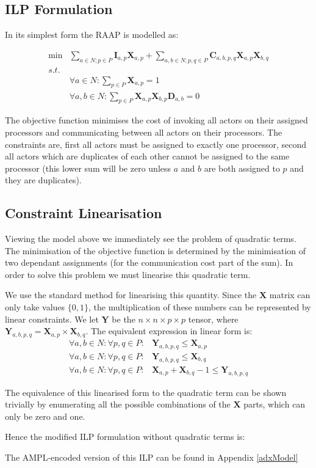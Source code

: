 \subsection{ILP Formulation}

In its simplest form the RAAP is modelled as:

\begin{align}
	\nonumber \min & \sum_{a \in N; p \in P} \mathbf{I}_{a,p}\mathbf{X}_{a,p} + \sum_{a,b \in N; p,q \in P} \mathbf{C}_{a,b,p,q}\mathbf{X}_{a,p}\mathbf{X}_{b,q} \\
	\nonumber s.t. &  \\
	\nonumber & \forall a \in N : \sum_{p \in P}\mathbf{X}_{a,p} = 1 \\
	\nonumber & \forall a,b \in N : \sum_{p \in P}\mathbf{X}_{a,p}\mathbf{X}_{b,p}\mathbf{D}_{a,b} = 0
\end{align}

The objective function minimises the cost of invoking all actors on their assigned processors and communicating between all actors on their processors.
The constraints are, first all actors must be assigned to exactly one processor, second all actors which are duplicates of each other cannot be assigned to the same processor (this lower sum will be zero unless $a$ and $b$ are both assigned to $p$ and they are duplicates).

\subsection{Constraint Linearisation}
\label{secModLin}

Viewing the model above we immediately see the problem of quadratic terms.
The minimisation of the objective function is determined by the minimisation of two dependant assignments (for the communication cost part of the sum).
In order to solve this problem we must linearise this quadratic term.

We use the standard method for linearising this quantity.
Since the $\mathbf{X}$ matrix can only take values $\{0, 1\}$, the multiplication of these numbers can be represented by linear constraints.
We let $\mathbf{Y}$ be the $n \times n \times p \times p$ tensor, where $\mathbf{Y}_{a,b,p,q} = \mathbf{X}_{a,p} \times \mathbf{X}_{b,q}$.
The equivalent expression in linear form is:
\begin{align}
	\nonumber \forall a,b \in N : \forall p,q \in P : & \mathbf{Y}_{a,b,p,q} \leq \mathbf{X}_{a,p} \\
	\nonumber \forall a,b \in N : \forall p,q \in P : & \mathbf{Y}_{a,b,p,q} \leq \mathbf{X}_{b,q} \\
	\nonumber \forall a,b \in N : \forall p,q \in P : & \mathbf{X}_{a,p} + \mathbf{X}_{b,q} - 1 \leq \mathbf{Y}_{a,b,p,q}
\end{align}

The equivalence of this linearised form to the quadratic term can be shown trivially by enumerating all the possible combinations of the $\mathbf{X}$ parts, which can only be zero and one.

Hence the modified ILP formulation without quadratic terms is:



The AMPL-encoded version of this ILP can be found in Appendix \ref{adxModel}
